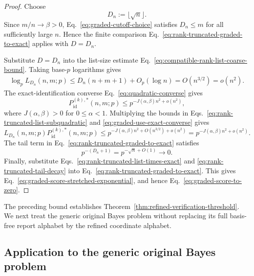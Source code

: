 \documentclass[11pt]{article}
\newcommand{\1}{\mathbf 1}
\theoremstyle{plain}
\theoremstyle{definition}
\theoremstyle{remark}
\begin{document}
\begin{proof}
Choose
\begin{equation}
 D_n:=\lfloor\sqrt n\rfloor.
 \label{eq:graded-cutoff-choice}
\end{equation}
Since $m/n\to\beta>0$, Eq.~\eqref{eq:graded-cutoff-choice} satisfies
$D_n\le m$ for all sufficiently large $n$.  Hence the finite comparison
Eq.~\eqref{eq:rank-truncated-graded-to-exact} applies with $D=D_n$.

Substitute $D=D_n$ into the list-size estimate
Eq.~\eqref{eq:compatible-rank-list-coarse-bound}.  Taking base-$p$
logarithms gives
\begin{align}
 \log_p L_{D_n}(n,m;p)
 \le D_n(n+m+1)+O_p(\log n)
 =O(n^{3/2})=o(n^2).
 \label{eq:rank-truncated-list-subquadratic}
\end{align}
The exact-identification converse Eq.~\eqref{eq:quadratic-converse} gives
\begin{equation}
 P_{\mathrm{id}}^{(k),*}(n,m;p)
 \le p^{-J(\alpha,\beta)n^2+o(n^2)},
 \label{eq:graded-use-exact-converse}
\end{equation}
where $J(\alpha,\beta)>0$ for $0\le\alpha<1$.  Multiplying the bounds in
Eqs.~\eqref{eq:rank-truncated-list-subquadratic} and
\eqref{eq:graded-use-exact-converse} gives
\begin{equation}
 L_{D_n}(n,m;p)P_{\mathrm{id}}^{(k),*}(n,m;p)
 \le p^{-J(\alpha,\beta)n^2+O(n^{3/2})+o(n^2)}
 =p^{-J(\alpha,\beta)n^2+o(n^2)}.
 \label{eq:rank-truncated-list-times-exact}
\end{equation}
The tail term in Eq.~\eqref{eq:rank-truncated-graded-to-exact} satisfies
\begin{equation}
 p^{-(D_n+1)}=p^{-\sqrt n+O(1)}\longrightarrow0.
 \label{eq:rank-truncated-tail-decay}
\end{equation}
Finally, substitute Eqs.~\eqref{eq:rank-truncated-list-times-exact} and
\eqref{eq:rank-truncated-tail-decay} into
Eq.~\eqref{eq:rank-truncated-graded-to-exact}.  This gives
Eq.~\eqref{eq:graded-score-stretched-exponential}, and hence
Eq.~\eqref{eq:graded-score-to-zero}.
\end{proof}



The preceding bound establishes  
Theorem~\ref{thm:refined-verification-threshold}.  We next treat the generic  
original Bayes problem without replacing its full basis-free report alphabet  
by the refined coordinate alphabet.  


\subsection{Application to the generic original Bayes problem}
\label{subsec:generic-original-graded-application}
\end{document}
